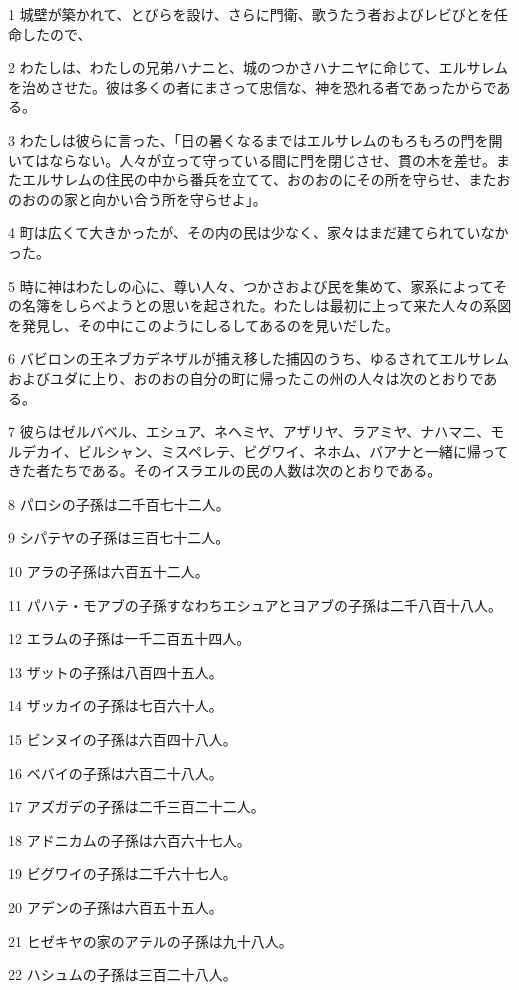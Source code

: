 \par 1 城壁が築かれて、とびらを設け、さらに門衛、歌うたう者およびレビびとを任命したので、
\par 2 わたしは、わたしの兄弟ハナニと、城のつかさハナニヤに命じて、エルサレムを治めさせた。彼は多くの者にまさって忠信な、神を恐れる者であったからである。
\par 3 わたしは彼らに言った、「日の暑くなるまではエルサレムのもろもろの門を開いてはならない。人々が立って守っている間に門を閉じさせ、貫の木を差せ。またエルサレムの住民の中から番兵を立てて、おのおのにその所を守らせ、またおのおのの家と向かい合う所を守らせよ」。
\par 4 町は広くて大きかったが、その内の民は少なく、家々はまだ建てられていなかった。
\par 5 時に神はわたしの心に、尊い人々、つかさおよび民を集めて、家系によってその名簿をしらべようとの思いを起された。わたしは最初に上って来た人々の系図を発見し、その中にこのようにしるしてあるのを見いだした。
\par 6 バビロンの王ネブカデネザルが捕え移した捕囚のうち、ゆるされてエルサレムおよびユダに上り、おのおの自分の町に帰ったこの州の人々は次のとおりである。
\par 7 彼らはゼルバベル、エシュア、ネヘミヤ、アザリヤ、ラアミヤ、ナハマニ、モルデカイ、ビルシャン、ミスペレテ、ビグワイ、ネホム、バアナと一緒に帰ってきた者たちである。そのイスラエルの民の人数は次のとおりである。
\par 8 パロシの子孫は二千百七十二人。
\par 9 シパテヤの子孫は三百七十二人。
\par 10 アラの子孫は六百五十二人。
\par 11 パハテ・モアブの子孫すなわちエシュアとヨアブの子孫は二千八百十八人。
\par 12 エラムの子孫は一千二百五十四人。
\par 13 ザットの子孫は八百四十五人。
\par 14 ザッカイの子孫は七百六十人。
\par 15 ビンヌイの子孫は六百四十八人。
\par 16 ベバイの子孫は六百二十八人。
\par 17 アズガデの子孫は二千三百二十二人。
\par 18 アドニカムの子孫は六百六十七人。
\par 19 ビグワイの子孫は二千六十七人。
\par 20 アデンの子孫は六百五十五人。
\par 21 ヒゼキヤの家のアテルの子孫は九十八人。
\par 22 ハシュムの子孫は三百二十八人。
